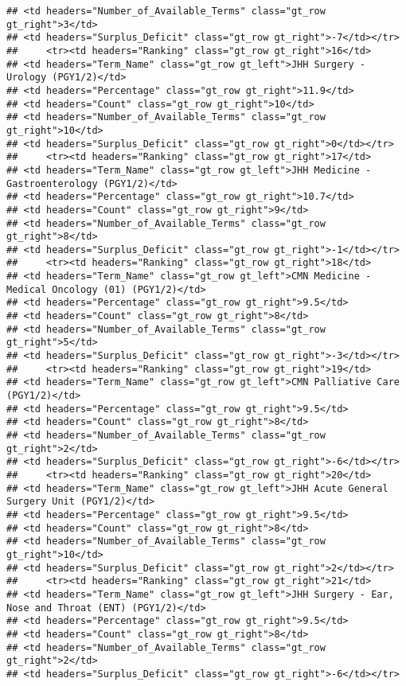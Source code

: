 \documentclass[
]{article}
\begin{document}
\begin{verbatim}
## <td headers="Number_of_Available_Terms" class="gt_row gt_right">3</td>
## <td headers="Surplus_Deficit" class="gt_row gt_right">-7</td></tr>
##     <tr><td headers="Ranking" class="gt_row gt_right">16</td>
## <td headers="Term_Name" class="gt_row gt_left">JHH Surgery - Urology (PGY1/2)</td>
## <td headers="Percentage" class="gt_row gt_right">11.9</td>
## <td headers="Count" class="gt_row gt_right">10</td>
## <td headers="Number_of_Available_Terms" class="gt_row gt_right">10</td>
## <td headers="Surplus_Deficit" class="gt_row gt_right">0</td></tr>
##     <tr><td headers="Ranking" class="gt_row gt_right">17</td>
## <td headers="Term_Name" class="gt_row gt_left">JHH Medicine - Gastroenterology (PGY1/2)</td>
## <td headers="Percentage" class="gt_row gt_right">10.7</td>
## <td headers="Count" class="gt_row gt_right">9</td>
## <td headers="Number_of_Available_Terms" class="gt_row gt_right">8</td>
## <td headers="Surplus_Deficit" class="gt_row gt_right">-1</td></tr>
##     <tr><td headers="Ranking" class="gt_row gt_right">18</td>
## <td headers="Term_Name" class="gt_row gt_left">CMN Medicine - Medical Oncology (01) (PGY1/2)</td>
## <td headers="Percentage" class="gt_row gt_right">9.5</td>
## <td headers="Count" class="gt_row gt_right">8</td>
## <td headers="Number_of_Available_Terms" class="gt_row gt_right">5</td>
## <td headers="Surplus_Deficit" class="gt_row gt_right">-3</td></tr>
##     <tr><td headers="Ranking" class="gt_row gt_right">19</td>
## <td headers="Term_Name" class="gt_row gt_left">CMN Palliative Care (PGY1/2)</td>
## <td headers="Percentage" class="gt_row gt_right">9.5</td>
## <td headers="Count" class="gt_row gt_right">8</td>
## <td headers="Number_of_Available_Terms" class="gt_row gt_right">2</td>
## <td headers="Surplus_Deficit" class="gt_row gt_right">-6</td></tr>
##     <tr><td headers="Ranking" class="gt_row gt_right">20</td>
## <td headers="Term_Name" class="gt_row gt_left">JHH Acute General Surgery Unit (PGY1/2)</td>
## <td headers="Percentage" class="gt_row gt_right">9.5</td>
## <td headers="Count" class="gt_row gt_right">8</td>
## <td headers="Number_of_Available_Terms" class="gt_row gt_right">10</td>
## <td headers="Surplus_Deficit" class="gt_row gt_right">2</td></tr>
##     <tr><td headers="Ranking" class="gt_row gt_right">21</td>
## <td headers="Term_Name" class="gt_row gt_left">JHH Surgery - Ear, Nose and Throat (ENT) (PGY1/2)</td>
## <td headers="Percentage" class="gt_row gt_right">9.5</td>
## <td headers="Count" class="gt_row gt_right">8</td>
## <td headers="Number_of_Available_Terms" class="gt_row gt_right">2</td>
## <td headers="Surplus_Deficit" class="gt_row gt_right">-6</td></tr>

\end{verbatim}
\end{document}
